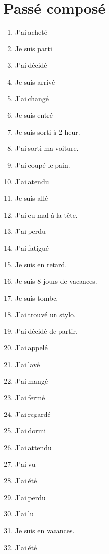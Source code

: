 \section{Passé composé}


\begin{enumerate}
    \item J'ai acheté
    \item Je suis parti
    \item J'ai décidé
    \item Je suis arrivé
    \item J'ai changé
    \item Je suis entré 
    \item Je suis sorti à 2 heur. 
    \item J'ai sorti ma voiture.
    \item J'ai coupé le pain.
    \item J'ai atendu 
    \item Je suis allé
    \item J'ai eu mal à la tête.
    \item J'ai perdu
    \item J'ai fatigué
    \item Je suis en retard.
    \item Je suis 8 jours de vacances.
    \item Je suis tombé.
    \item J'ai trouvé un stylo.
    \item J'ai décidé de partir.
    \item J'ai appelé
    \item J'ai lavé
    \item J'ai mangé
    \item J'ai fermé
    \item J'ai regardé
    \item J'ai dormi
    \item J'ai attendu
    \item J'ai vu
    \item J'ai été
    \item J'ai perdu
    \item J'ai lu 
    \item Je suis en vacances.
    \item J'ai été 
\end{enumerate}